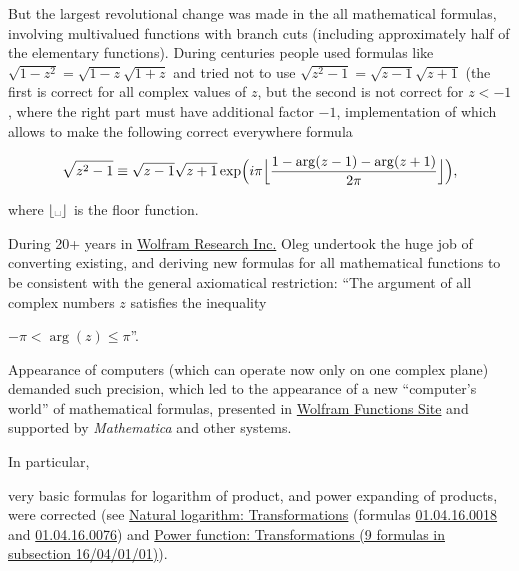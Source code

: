 But the largest revolutional change was made in the all mathematical formulas, involving multivalued functions with branch cuts (including approximately half of the elementary functions). During centuries people used formulas like $\sqrt{1-z^2}= \sqrt{1-z} \sqrt{1+z}$ and tried not to use $\sqrt{z^2-1}=\sqrt{z-1}\sqrt{z+1}$ (the first is correct for all complex values of $z$, but the second is not correct for $z<-1$, where the right part must have additional factor $-1$, implementation of which allows to make the following correct everywhere formula 

$$\sqrt{z^2-1}\equiv \sqrt{z-1} \sqrt{z+1} \exp\Bigl(i \pi \Bigl\lfloor \frac{1-\arg(z-1)-\arg(z+1)}{2 \pi}

\Bigr\rfloor\Bigr), $$ 

where $\lfloor \text{\textvisiblespace} \rfloor$ is the floor function.

During 20+ years in \href{http://www.wolfram.com/}{Wolfram Research Inc.}  Oleg undertook the huge job of converting existing, and deriving new formulas for all mathematical functions to be consistent with the general axiomatical restriction: ``The argument of all complex numbers $z$ satisfies the  inequality 

${-\pi < \arg(z)\leq \pi}$''. 

Appearance of computers (which can operate now only on one complex plane) demanded such precision, which led to the appearance of a new ``computer's world''  of mathematical formulas, presented in \href{http://functions.wolfram.com/}{Wolfram Functions Site} and supported by {\it Mathematica} and other systems. 

In particular, 



very basic formulas for logarithm of product, and power expanding of products, were corrected (see \href{http://functions.wolfram.com/ElementaryFunctions/Log/16/04/01/}{Natural logarithm: Transformations} (formulas \href{http://functions.wolfram.com/ElementaryFunctions/Log/16/04/01/0008/}{01.04.16.0018} and \href{http://functions.wolfram.com/ElementaryFunctions/Log/16/04/01/0009/}{01.04.16.0076}) and \href{http://functions.wolfram.com/ElementaryFunctions/Power/16/04/01/01/}{Power function: Transformations (9 formulas in subsection 16/04/01/01)}).    

